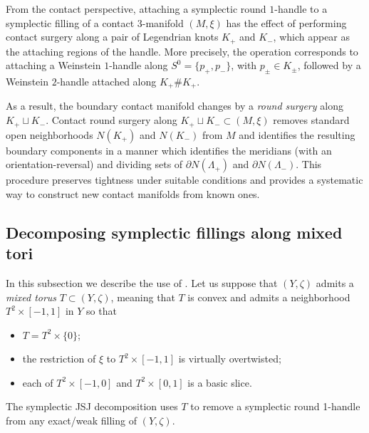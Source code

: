 \documentclass[11pt]{amsart}
\numberwithin{equation}{section}
\theoremstyle{plain}
\theoremstyle{definition}
\theoremstyle{remark}\newtheorem{rem}[equation]{Remark}%
\theoremstyle{remark}\newtheorem{obs}[equation]{Observation}%
\begin{document}
From the contact perspective, attaching a symplectic round $1$-handle to a symplectic filling of a contact $3$-manifold $(M,\xi)$ has the effect of performing contact surgery along a pair of Legendrian knots $K_{+}$ and $K_{-}$, which appear as the attaching regions of the handle.  More precisely, the operation corresponds to attaching a Weinstein $1$-handle along $S^0=\{p_+,p_-\}$, with $p_{\pm}\in K_{\pm}$, followed by a Weinstein $2$-handle attached along $K_+\#K_+$.

As a result, the boundary contact manifold changes by a \emph{round surgery} along $K_{+} \sqcup K_{-}$.  Contact round surgery along $K_+\sqcup K_-\subset(M,\xi)$ removes standard open neighborhoods $N(K_+)$ and $N(K_-)$ from $M$ and identifies the resulting boundary components in a manner which identifies the meridians (with an orientation-reversal) and dividing sets of $\partial N(\Lambda_+)$ and $\partial N(\Lambda_-)$.  This procedure preserves tightness under suitable conditions and provides a systematic way to construct new contact manifolds from known ones.  

\subsection{Decomposing symplectic fillings along mixed tori}

In this subsection we describe the use of .  Let us suppose that $(Y,\zeta)$ admits a \emph{mixed torus} $T\subset(Y,\zeta)$, meaning that $T$ is convex and admits a neighborhood $T^2\times[-1,1]$ in $Y$ so that
\begin{itemize}
    \item $T=T^2\times\{0\}$;
    \item the restriction of $\xi$ to $T^2\times[-1,1]$ is virtually overtwisted;
    \item each of $T^2\times[-1,0]$ and $T^2\times[0,1]$ is a basic slice.
\end{itemize}
The symplectic JSJ decomposition uses $T$ to remove a symplectic round 1-handle from any exact/weak filling of $(Y,\zeta)$.
\end{document}
